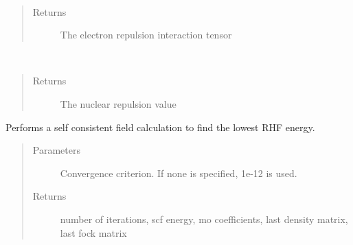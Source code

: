 \documentclass[letterpaper,10pt,english]{sphinxmanual}
\begin{document}
\begin{fulllineitems}
\begin{fulllineitems}
\label{\detokenize{RHF:ghf.RHF.RHF.get_two_e}}~\begin{quote}\begin{description}
\item[{Returns}] \leavevmode
The electron repulsion interaction tensor

\end{description}\end{quote}

\end{fulllineitems}


\begin{fulllineitems}
\label{\detokenize{RHF:ghf.RHF.RHF.nuc_rep}}~\begin{quote}\begin{description}
\item[{Returns}] \leavevmode
The nuclear repulsion value

\end{description}\end{quote}

\end{fulllineitems}


\begin{fulllineitems}
\label{\detokenize{RHF:ghf.RHF.RHF.scf}}
Performs a self consistent field calculation to find the lowest RHF energy.
\begin{quote}\begin{description}
\item[{Parameters}] \leavevmode
{} \textendash{} Convergence criterion. If none is specified, 1e-12 is used.

\item[{Returns}] \leavevmode
number of iterations, scf energy, mo coefficients, last density matrix, last fock matrix

\end{description}\end{quote}

\end{fulllineitems}


\end{fulllineitems}
\end{document}
